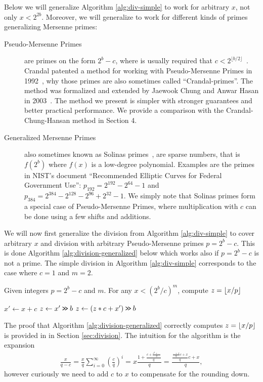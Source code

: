Below we will generalize Algorithm \ref{alg:div-simple} to work for
arbitrary $x$, not only $x<2^{2b}$. Moreover, we will generalize
to work for different kinds of primes generalizing Mersenne primes:
\begin{description}
   \item[Pseudo-Mersenne Primes]
      are primes on the form $2^b-c$, where is usually required that $c < 2^{\lfloor b/2\rfloor}$~\cite{van2014encyclopedia}.
      Crandal patented a method for working with Pseudo-Mersenne Primes in 1992~\cite{crandall1992method},
      why those primes are also sometimes called ``Crandal-primes''.
      The method was formalized and extended by Jaewook Chung and Anwar Hasan in 2003~\cite{chung2003more}. The method we present is simpler with
      stronger guarantees and better practical performance.
      We provide a comparison with the Crandal-Chung-Hansan method in Section 4.
   \item[Generalized Mersenne Primes]
      also sometimes known as Solinas primes~\cite{Solinas2011}, are sparse numbers, that is $f(2^b)$ where $f(x)$ is a low-degree polynomial.
      Examples are the primes in NIST's document ``Recommended Elliptic Curves for Federal Government Use'':
         $p_{192} = 2^{192} - 2^{64} - 1$
      and
         $p_{384} = 2^{384}-2^{128}-2^{96}+2^{32}-1$.
      We simply note that Solinas primes form a special case of
      Pseudo-Mersenne Primes, where multiplication with $c$
      can be done using a few shifts and additions.
\end{description}
We will now first generalize the division from Algorithm \ref{alg:div-simple}
to cover arbitrary $x$ and division with arbitrary Pseudo-Mersenne primes $p=2^b-c$. This is done Algorithm \ref{alg:division-generalized} below which
works also if $p=2^b-c$ is not a prime.  The
simple division in Algorithm \ref{alg:div-simple} corresponds to the case
where $c=1$ and $m=2$.
\begin{algorithm}[H]
  \caption{Given integers $p=2^b-c$ and $m$.
    For any $x< (2^b/c)^m$, compute $z=\lfloor {x/p} \rfloor$}
   \label{alg:division-generalized}
   \begin{algorithmic}
         \State $x' \gets x + c$
         \State $z \gets x' \mathbin{\texttt{>\!>}} b$
            \State $z \gets (z * c + x')\mathbin{\texttt{>\!>}} b$
         \EndFor
   \end{algorithmic}
\end{algorithm}
The proof that Algorithm \ref{alg:division-generalized} correctly computes
 $z=\lfloor {x/p} \rfloor$ is provided in in Section \ref{sec:division}.
The intuition for the algorithm is the expansion
\begin{align}
   \frac{x}{q-c}
   = \frac{x}{q}\sum_{i=0}^\infty \left(\frac{c}{q}\right)^i
   = x\frac{1+\frac{c+\frac{c^2 + \dots}{q}}{q}}{q}
   = \frac{\frac{\frac{\dots+x}{q}c+x}{q}c+x}{q},
\end{align}
however curiously we need to add $c$ to $x$ to compensate for the
rounding down.

